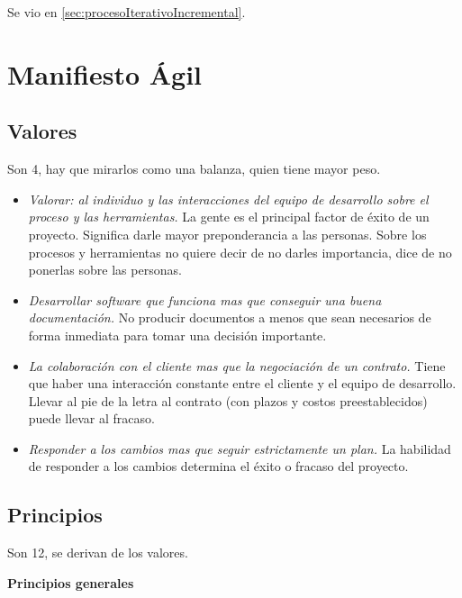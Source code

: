 \documentclass[titlepage,a4paper]{article}
\begin{document}
Se vio en \ref{sec:procesoIterativoIncremental}.

\section{Manifiesto Ágil}
\subsection{Valores}
Son 4, hay que mirarlos como una balanza, quien tiene mayor peso.
\begin{itemize}
    \item \textit{Valorar: al individuo y las interacciones del equipo de desarrollo sobre el proceso y las herramientas.} La gente es el principal factor de éxito de un proyecto. Significa darle mayor preponderancia a las personas. Sobre los procesos y herramientas no quiere decir de no darles importancia, dice de no ponerlas sobre las personas.
    \item \textit{Desarrollar software que funciona mas que conseguir una buena documentación.} No producir documentos a menos que sean necesarios de forma inmediata para tomar una decisión importante.
    \item \textit{La colaboración con el cliente mas que la negociación de un contrato.} Tiene que haber una interacción constante entre el cliente y el equipo de desarrollo. Llevar al pie de la letra al contrato (con plazos y costos preestablecidos) puede llevar al fracaso.
    \item \textit{Responder a los cambios mas que seguir estrictamente un plan.} La habilidad de responder a los cambios determina el éxito o fracaso del proyecto.
\end{itemize}

\newpage

\subsection{Principios}
Son 12, se derivan de los valores.

\textbf{Principios generales}
\end{document}
